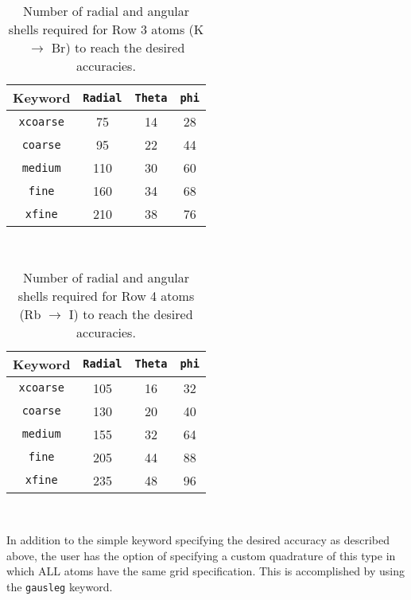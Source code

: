 \begin{center}
\begin{table}[htb]
\caption{Number of radial and angular shells required for Row 3 atoms
  (K $\rightarrow$ Br) to reach the desired accuracies.}

\vspace{.2in}

  \begin{tabular}[right]{|c|c|c|c|} \hline
Keyword & {\tt Radial} & {\tt Theta} & {\tt phi} \\ \hline
{\tt xcoarse} & 75 & 14 & 28  \\ \hline
{\tt coarse}  & 95 & 22 & 44  \\ \hline
{\tt medium}  &110 & 30 & 60  \\ \hline
{\tt fine}    &160 & 34 & 68  \\ \hline
{\tt xfine}   &210 & 38 & 76  \\ \hline
  \end{tabular} \\
\end{table}
\end{center}

\begin{center}
\begin{table}[htb]
\caption{Number of radial and angular shells required for Row 4 atoms
  (Rb $\rightarrow$ I) to reach the desired accuracies.}

\vspace{.2in}

  \begin{tabular}[right]{|c|c|c|c|} \hline
Keyword & {\tt Radial} & {\tt Theta} & {\tt phi} \\ \hline
{\tt xcoarse} &105 & 16 & 32  \\ \hline
{\tt coarse}  &130 & 20 & 40  \\ \hline
{\tt medium}  &155 & 32 & 64  \\ \hline
{\tt fine}    &205 & 44 & 88  \\ \hline
{\tt xfine}   &235 & 48 & 96  \\ \hline
  \end{tabular} \\
\end{table}
\end{center}


In addition to the simple keyword specifying the desired accuracy as
described above, the user has the option of specifying a custom
quadrature of this type in which ALL atoms have the same grid
specification.  This is accomplished by using the \verb+gausleg+ keyword.

